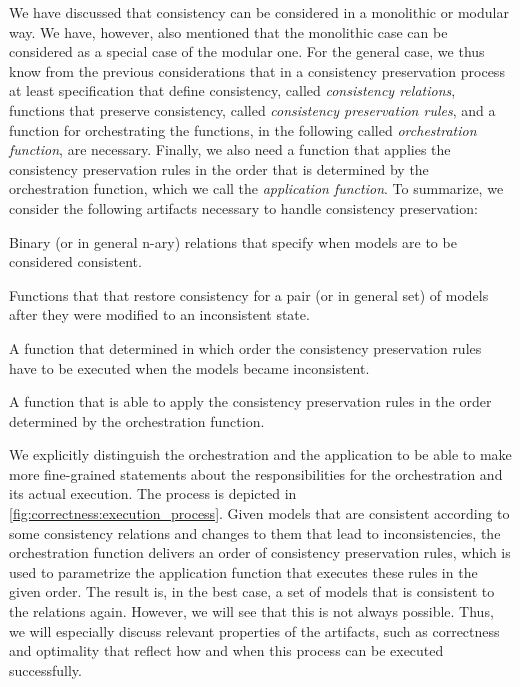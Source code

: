 We have discussed that consistency can be considered in a monolithic or modular way. We have, however, also mentioned that the monolithic case can be considered as a special case of the modular one.
For the general case, we thus know from the previous considerations that in a consistency preservation process at least specification that define consistency, called \emph{\glspl{consistency relation}}, functions that preserve consistency, called \emph{\glspl{consistency preservation rule}}, and a function for orchestrating the functions, in the following called \emph{\gls{orchestration function}}, are necessary. Finally, we also need a function that applies the \glspl{consistency preservation rule} in the order that is determined by the orchestration function, which we call the \emph{\gls{application function}}.
To summarize, we consider the following artifacts necessary to handle consistency preservation:
\begin{properdescription}
    \item[\Glspl{consistency relation}:] Binary (or in general n-ary) relations that specify when models are to be considered consistent.
    \item[\Glspl{consistency preservation rule}:] Functions that that restore consistency for a pair (or in general set) of models after they were modified to an inconsistent state.
    \item[\Gls{orchestration function}:] A function that determined in which order the consistency preservation rules have to be executed when the models became inconsistent.
    \item[\Gls{application function}:] A function that is able to apply the consistency preservation rules in the order determined by the orchestration function. 
\end{properdescription}

We explicitly distinguish the orchestration and the application to be able to make more fine-grained statements about the responsibilities for the orchestration and its actual execution.
The process is depicted in \autoref{fig:correctness:execution_process}. Given models that are consistent according to some consistency relations and changes to them that lead to inconsistencies, the orchestration function delivers an order of consistency preservation rules, which is used to parametrize the application function that executes these rules in the given order.
The result is, in the best case, a set of models that is consistent to the relations again.
However, we will see that this is not always possible. Thus, we will especially discuss relevant properties of the artifacts, such as correctness and optimality that reflect how and when this process can be executed successfully.

